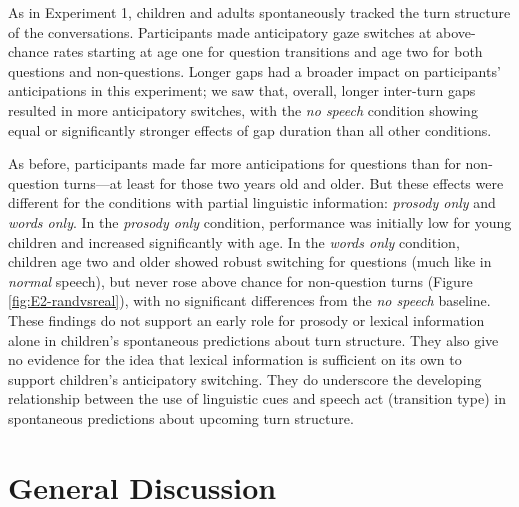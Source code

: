 \documentclass[authoryear, 12pt]{elsarticle}
\begin{document}
As in Experiment 1, children and adults spontaneously tracked the turn structure of the conversations. Participants made anticipatory gaze switches at above-chance rates starting at age one for question transitions and age two for both questions and non-questions. Longer gaps had a broader impact on participants' anticipations in this experiment; we saw that, overall, longer inter-turn gaps resulted in more anticipatory switches, with the \textit{no speech} condition showing equal or significantly stronger effects of gap duration than all other conditions.

As before, participants made far more anticipations for questions than for non-question turns---at least for those two years old and older. But these effects were different for the conditions with partial linguistic information: \textit{prosody only} and \textit{words only}. In the \textit{prosody only} condition, performance was initially low for young children and increased significantly with age. In the \textit{words only} condition, children age two and older showed robust switching for questions (much like in \textit{normal} speech), but never rose above chance for non-question turns (Figure \ref{fig:E2-randvsreal}), with no significant differences from the \textit{no speech} baseline. These findings do not support an early role for prosody or lexical information alone in children's spontaneous predictions about turn structure. They also give no evidence for the idea that lexical information is sufficient on its own to support children's anticipatory switching. They do underscore the developing relationship between the use of linguistic cues and speech act (transition type) in spontaneous predictions about upcoming turn structure.

\section*{General Discussion}
\label{sec:gendisc}
\end{document}
